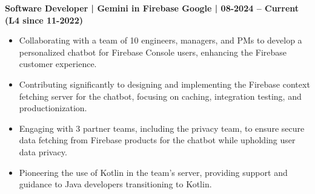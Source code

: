 \textbf{Software Developer | Gemini in Firebase \hspace{-10mm} \hfill Google | 08-2024 -- Current (L4 since 11-2022)}

\begin{itemize}
  \item Collaborating with a team of 10 engineers, managers, and PMs to develop a personalized chatbot for Firebase Console users, enhancing the Firebase customer experience.
  \item Contributing significantly to designing and implementing the Firebase context fetching server for the chatbot, focusing on caching, integration testing, and productionization.
  \item Engaging with 3 partner teams, including the privacy team, to ensure secure data fetching from Firebase products for the chatbot while upholding user data privacy.
  \item Pioneering the use of Kotlin in the team's server, providing support and guidance to Java developers transitioning to Kotlin.
\end{itemize}



